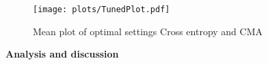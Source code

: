 \begin{figure}[H]
\centering
\texttt{[image: plots/TunedPlot.pdf]}
\caption{Mean plot of optimal settings Cross entropy and CMA}
\end{figure}


\textbf{Analysis and discussion}\\


